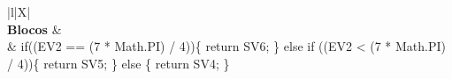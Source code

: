 \begin{xltabular}{\textwidth}{|l|X|}
		 \\ \hline
		\textbf{Blocos} &  \\ \hline
		 & if((EV2 == (7 * Math.PI) / 4))\{   return SV6; \} else if ((EV2 < (7 * Math.PI) / 4))\{   return SV5; \} else \{   return SV4; \} \\ \hline

\end{xltabular}


